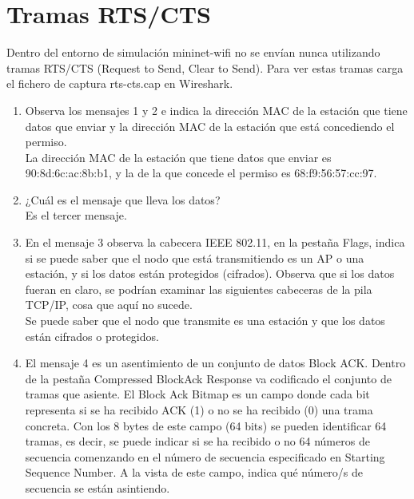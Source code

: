 \documentclass[12pt, a4paper]{report}
\begin{document}
\chapter{Tramas RTS/CTS}
Dentro del entorno de simulación mininet-wifi no se envían nunca utilizando tramas RTS/CTS
(Request to Send, Clear to Send). Para ver estas tramas carga el fichero de captura rts-cts.cap en
Wireshark.
\begin{enumerate}
	\item Observa los mensajes 1 y 2 e indica la dirección MAC de la estación que tiene datos que enviar
	y la dirección MAC de la estación que está concediendo el permiso.\\
	
	La dirección MAC de la estación que tiene datos que enviar es 90:8d:6c:ac:8b:b1, y la de la que concede el permiso es 68:f9:56:57:cc:97.
	\item ¿Cuál es el mensaje que lleva los datos?\\
	
	Es el tercer mensaje.
	\item En el mensaje 3 observa la cabecera IEEE 802.11, en la pestaña Flags, indica si se puede saber
	que el nodo que está transmitiendo es un AP o una estación, y si los datos están protegidos
	(cifrados). Observa que si los datos fueran en claro, se podrían examinar las siguientes cabeceras
	de la pila TCP/IP, cosa que aquí no sucede.\\
	
	Se puede saber que el nodo que transmite es una estación y que los datos están cifrados o protegidos.
	\item El mensaje 4 es un asentimiento de un conjunto de datos Block ACK. Dentro de la pestaña
	Compressed BlockAck Response va codificado el conjunto de tramas que asiente.
	El Block Ack Bitmap es un campo donde cada bit representa si se ha recibido ACK (1) o no se
	ha recibido (0) una trama concreta. Con los 8 bytes de este campo (64 bits) se pueden identificar
	64 tramas, es decir, se puede indicar si se ha recibido o no 64 números de secuencia comenzando
	en el número de secuencia especificado en Starting Sequence Number. A la vista de este campo,
	indica qué número/s de secuencia se están asintiendo.\\
	

\end{enumerate}
\end{document}
